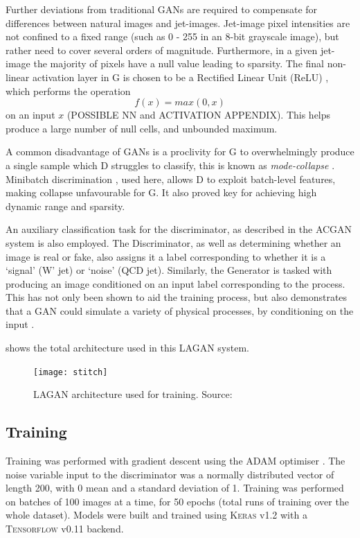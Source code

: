 \documentclass{report}
\newcommand{\pkg}[1]{\textsc{#1}}
\begin{document}
Further deviations from traditional GANs are required to compensate for differences between natural images and jet-images. Jet-image pixel intensities are not confined to a fixed range (such as 0 - 255 in an 8-bit grayscale image), but rather need to cover several orders of magnitude. Furthermore, in a given jet-image the majority of pixels have a null value leading to sparsity. The final non-linear activation layer in G is chosen to be a Rectified Linear Unit (ReLU) \cite{relu}, which performs the operation
$$
f(x) = max(0, x)
$$
on an input $x$ (POSSIBLE NN and ACTIVATION APPENDIX). This helps produce a large number of null cells, and unbounded maximum. 

A common disadvantage of GANs is a proclivity for G to overwhelmingly produce a single sample which D struggles to classify, this is known as \textit{mode-collapse} \cite{gan1}. Minibatch discrimination \cite{improvedgan}, used here, allows D to exploit batch-level features, making collapse unfavourable for G. It also proved key for achieving high dynamic range and sparsity.

An auxiliary classification task for the discriminator, as described in the ACGAN system \cite{odena2016conditional} is also employed. The Discriminator, as well as determining whether an image is real or fake, also assigns it a label corresponding to whether it is a `signal' (W' jet) or `noise' (QCD jet). Similarly, the Generator is tasked with producing an image conditioned on an input label corresponding to the process. This has not only been shown to aid the training process, but also demonstrates that a GAN could simulate a variety of physical processes, by conditioning on the input \cite{mirza2014conditional}.

 shows the total architecture used in this LAGAN system. 
\begin{figure}[H]
	\centering
	\texttt{[image: stitch]}
	
	\caption{LAGAN architecture used for training. Source: \cite{de2017learning}}
	\label{fig:stitch}
	
\end{figure}   

\subsection{Training}
\label{sec:training}
Training was performed with gradient descent using the ADAM optimiser \cite{adam}. The noise variable input to the discriminator was a normally distributed vector of length 200, with 0 mean and a standard deviation of 1. Training was performed on batches of 100 images at a time, for 50 epochs (total runs of training over the whole dataset). Models were built and trained using \pkg{Keras} v1.2 \cite{keras} with a \pkg{Tensorflow} v0.11 \cite{tensorflow} backend.
\end{document}
